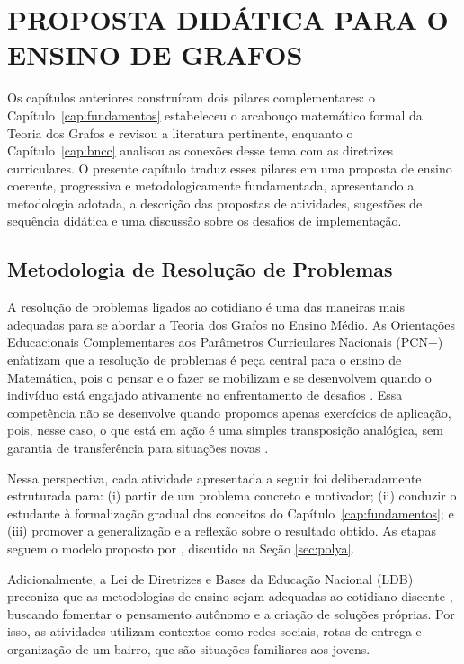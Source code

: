 \documentclass[
  12pt,
  oneside,
  a4paper,
  english,
  brazilian
  ]{abntex2}
\theoremstyle{definition}
\begin{document}
\chapter{PROPOSTA DIDÁTICA PARA O ENSINO DE GRAFOS}
\label{cap:proposta}

Os capítulos anteriores construíram dois pilares complementares: o Capítulo~\ref{cap:fundamentos} estabeleceu o arcabouço matemático formal da Teoria dos Grafos e revisou a literatura pertinente, enquanto o Capítulo~\ref{cap:bncc} analisou as conexões desse tema com as diretrizes curriculares. O presente capítulo traduz esses pilares em uma proposta de ensino coerente, progressiva e metodologicamente fundamentada, apresentando a metodologia adotada, a descrição das propostas de atividades, sugestões de sequência didática e uma discussão sobre os desafios de implementação.

\section{Metodologia de Resolução de Problemas}
\label{sec:metodologia}

A resolução de problemas ligados ao cotidiano é uma das maneiras mais adequadas para se abordar a Teoria dos Grafos no Ensino Médio. As Orientações Educacionais Complementares aos Parâmetros Curriculares Nacionais (PCN+) enfatizam que a resolução de problemas é peça central para o ensino de Matemática, pois o pensar e o fazer se mobilizam e se desenvolvem quando o indivíduo está engajado ativamente no enfrentamento de desafios \cite{brasil2002}. Essa competência não se desenvolve quando propomos apenas exercícios de aplicação, pois, nesse caso, o que está em ação é uma simples transposição analógica, sem garantia de transferência para situações novas \cite{brasil2002}.

Nessa perspectiva, cada atividade apresentada a seguir foi deliberadamente estruturada para: (i) partir de um problema concreto e motivador; (ii) conduzir o estudante à formalização gradual dos conceitos do Capítulo~\ref{cap:fundamentos}; e (iii) promover a generalização e a reflexão sobre o resultado obtido. As etapas seguem o modelo proposto por \textcite{polya2006}, discutido na Seção \ref{sec:polya}.

Adicionalmente, a Lei de Diretrizes e Bases da Educação Nacional (LDB) preconiza que as metodologias de ensino sejam adequadas ao cotidiano discente \cite{brasil1996}, buscando fomentar o pensamento autônomo e a criação de soluções próprias. Por isso, as atividades utilizam contextos como redes sociais, rotas de entrega e organização de um bairro, que são situações familiares aos jovens.
\end{document}
